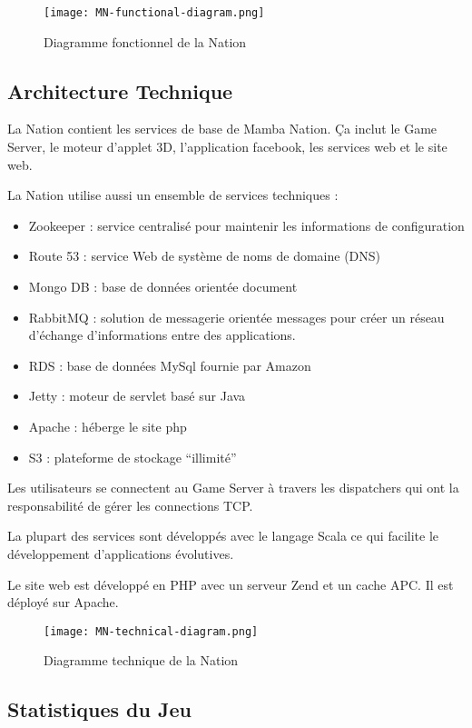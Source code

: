 \begin{figure}[H]
  \texttt{[image: MN-functional-diagram.png]} 
  \caption{Diagramme fonctionnel de la Nation}
\end{figure}

\subsection{Architecture Technique}

La Nation contient les services de base de Mamba Nation. Ça inclut le Game
Server, le moteur d'applet 3D, l'application facebook, les services web et le
site web.

La Nation utilise aussi un ensemble de services techniques :
\begin{itemize}
\item Zookeeper : service centralisé pour maintenir les informations de configuration
\item Route 53 : service Web de système de noms de domaine (DNS)
\item Mongo DB : base de données orientée document
\item RabbitMQ : solution de messagerie orientée messages pour créer un réseau
  d'échange d'informations entre des applications.
\item RDS : base de données MySql fournie par Amazon
\item Jetty : moteur de servlet basé sur Java
\item Apache : héberge le site php
\item S3 : plateforme de stockage ``illimité''
\end{itemize}

Les utilisateurs se connectent au Game Server à travers les dispatchers qui ont la
responsabilité de gérer les connections TCP.

La plupart des services sont développés avec le langage Scala ce qui facilite le
développement d'applications évolutives.

Le site web est développé en PHP avec un serveur Zend et un cache APC. Il est
déployé sur Apache.

\begin{figure}[H]
  \texttt{[image: MN-technical-diagram.png]} 
  \caption{Diagramme technique de la Nation}
\end{figure}

\subsection{Statistiques du Jeu}

